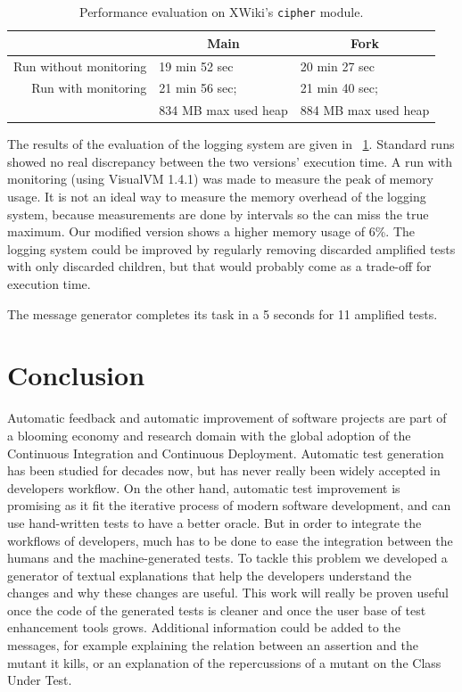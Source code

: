 \documentclass[a4paper,11pt]{sdm_internship}
\theoremstyle{definition}
\begin{document}
\begin{table}
  \centering
  \begin{tabular}{rll}
    \toprule
    \multicolumn{1}{c}{} & \multicolumn{1}{c}{\textbf{Main}} & \multicolumn{1}{c}{\textbf{Fork}} \\
    \midrule
    Run without monitoring & 19 min 52 sec & 20 min 27 sec \\
    Run with monitoring & 21 min 56 sec; & 21 min 40 sec; \\
      & 834 MB max used heap & 884 MB max used heap \\
    \bottomrule
  \end{tabular}
  \caption{Performance evaluation on XWiki's \texttt{cipher} module\protect\footnotemark.}%
  \label{tab:perf_exp}
\end{table}

The results of the evaluation of the logging system are given in \tablename~\ref{tab:perf_exp}.
Standard runs showed no real discrepancy between the two versions' execution time.
A run with monitoring (using VisualVM 1.4.1) was made to measure the peak of memory usage.
It is not an ideal way to measure the memory overhead of the logging system, because measurements are done by intervals so the can miss the true maximum.
Our modified version shows a higher memory usage of 6\%.
The logging system could be improved by regularly removing discarded amplified tests with only discarded children, but that would probably come as a trade-off for execution time.

The message generator completes its task in a 5 seconds for 11 amplified tests.


\section*{Conclusion}%
\label{sec:conclu}%
Automatic feedback and automatic improvement of software projects are part of a blooming economy and research domain with the global adoption of the Continuous Integration and Continuous Deployment.
Automatic test generation has been studied for decades now, but has never really been widely accepted in developers workflow.
On the other hand, automatic test improvement is promising as it fit the iterative process of modern software development, and can use hand-written tests to have a better oracle.
But in order to integrate the workflows of developers, much has to be done to ease the integration between the humans and the machine-generated tests.
To tackle this problem we developed a generator of textual explanations that help the developers understand the changes and why these changes are useful.
This work will really be proven useful once the code of the generated tests is cleaner and once the user base of test enhancement tools grows.
Additional information could be added to the messages, for example explaining the relation between an assertion and the mutant it kills, or an explanation of the repercussions of a mutant on the Class Under Test.
\end{document}

